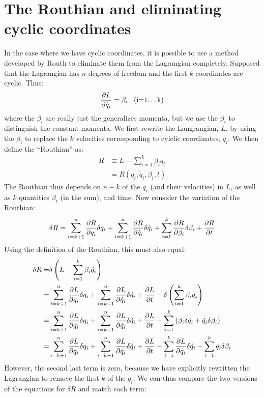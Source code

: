 \section{The Routhian and eliminating cyclic coordinates}
In the case where we have cyclic coordinates, it is possible to use a method developed by Routh to eliminate them from the Lagrangian completely. Supposed that the Lagrangian has $n$ degrees of freedom and the first $k$ coordinates are cyclic. Thus:
\begin{align}
\frac{\partial L}{\partial \dot{q}_i}=\beta_i \;\;\;\text{(i=1\dots k)}
\label{eqn:lbeta}
\end{align} 
where the $\beta_i$ are really just the generalizes momenta, but we use the $\beta_i$ to distinguish the constant momenta. We first rewrite the Langrangian, $L$, by using the $\beta_i$ to replace the $k$ velocities corresponding to cylclic coordinates, $\dot{q}_i$. We then define the ``Routhian'' as:
\begin{align}
R&\equiv L-\sum_{i=1}^k\beta_i\dot{q}_i\nonumber\\
&=R(q_i,\dot{q}_i,\beta_i, t)
\end{align}
The Routhian thus depends on $n-k$ of the $q_i$ (and their velocities) in $L$, as well as $k$ quantities $\beta_i$ (in the sum), and time. Now consider the variation of the Routhian:
\begin{align}
\delta R=\sum_{i=k+1}^{n}\frac{\partial R}{\partial q_i}\delta q_i+\sum_{i=k+1}^{n}\frac{\partial R}{\partial \dot{q}_i}\delta \dot{q}_i+\sum_{i=1}^k\frac{\partial R}{\partial \beta_i}\delta \beta_i+\frac{\partial R}{\partial t}
\end{align}
Using the definition of the Routhian, this must also equal:
\begin{align}
\delta R=&\delta\left(L-\sum_{i=1}^k\beta_i\dot{q}_i \right)\nonumber\\
=&\sum_{i=k+1}^{n}\frac{\partial L}{\partial q_i}\delta q_i+\sum_{i=k+1}^{n}\frac{\partial L}{\partial \dot{q}_i}\delta \dot{q}_i+\frac{\partial L}{\partial t}-\delta\left(\sum_{i=1}^k\beta_i\dot{q}_i\right)\nonumber\\
=&\sum_{i=k+1}^{n}\frac{\partial L}{\partial q_i}\delta q_i+\sum_{i=k+1}^{n}\frac{\partial L}{\partial \dot{q}_i}\delta \dot{q}_i+\frac{\partial L}{\partial t}-\sum_{i=1}^k\left(\beta_i\delta\dot{q}_i+\dot{q}_i\delta\beta_i\right)\nonumber\\
=&\sum_{i=k+1}^{n}\frac{\partial L}{\partial q_i}\delta q_i+\sum_{i=k+1}^{n}\frac{\partial L}{\partial \dot{q}_i}\delta \dot{q}_i+\frac{\partial L}{\partial t}-\sum_{i=1}^k\frac{\partial L}{\partial \dot{q}_i}\delta\dot{q}_i-\sum_{i=1}^k\dot{q}_i\delta\beta_i
\end{align}
However, the second last term is zero, because we have explicitly rewritten the Lagrangian to remove the first $k$ of the $\dot{q}_i$. We can thus compare the two versions of the equations for $\delta R$ and match each term:
